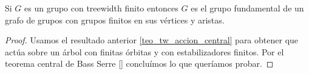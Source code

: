 \documentclass[tesis.tex]{subfiles}
\begin{document}
\begin{coro}
	Si $G$ es un grupo con treewidth finito entonces $G$ es el grupo fundamental de un grafo de grupos con grupos finitos en sus vértices y aristas.
\end{coro}
\begin{proof}
	Usamos el resultado anterior \ref{teo_tw_accion_central} para obtener que actúa sobre un árbol con finitas órbitas y con estabilizadores finitos.
	Por el teorema central de Bass Serre \ref{} concluímos lo que queríamos probar.
\end{proof}
\end{document}
